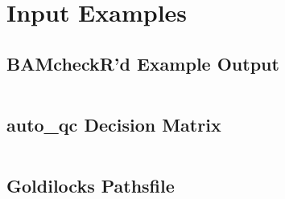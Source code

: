 \chapter{Input Examples}

\section{BAMcheckR'd Example Output}
\label{app:bamcheckr}
\inputminted[fontsize=\scriptsize]{text}{Appendix1/example.bamcheck.SN.txt}

\section{auto\_qc Decision Matrix}
\label{app:aqc_matrix}
\inputminted[fontsize=\scriptsize]{text}{Appendix1/example.aqc.txt}

\section{Goldilocks Pathsfile}
\label{app:pathsfile}
\inputminted[fontsize=\scriptsize]{text}{Appendix1/paths.g}
